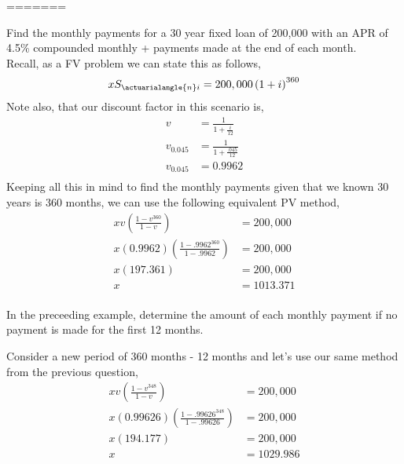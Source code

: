 \documentclass[12pt]{article}
\newenvironment{question}[2][Question]{\begin{trivlist}
\item[\hskip \labelsep {\bfseries #1}\hskip \labelsep {\bfseries #2.}]}{\end{trivlist}}
\begin{document}
=======
\begin{question}[Question 2.2.7]
	a Find the monthly payments for a 30 year fixed loan of 200,000
	with an APR of 4.5\% compounded monthly + payments made at the end
	of each month.\\

	Recall, as a FV problem we can state this as follows,\\
	\begin{align*}
		xS_{\actuarialangle{n}i} &= 200,000 \left(1+i \right)^{360}\\
	\end{align*}
	Note also, that our discount factor in this scenario is,\\
	\begin{align*}
		v &= \frac{1}{1+\frac{i}{12}}\\
		v_{0.045} &= \frac{1}{1+\frac{.045}{12}}\\
		v_{0.045} &= 0.9962\\
	\end{align*}
	Keeping all this in mind to find the monthly payments  given that we known 30 years
	is 360 months, we can use the following equivalent PV method,\\
	\begin{align*}
		xv \left(\frac{1-v^{360}}{1-v}\right) &= 200,000\\
		x \left(0.9962 \right)(\frac{1-.9962^{360}}{1-.9962})&= 200,000\\
		x \left(197.361\right) &= 200,000\\
		x &= 1013.371\\
	\end{align*}

\hline
\pagebreak

\begin{question}[Question 2.2.11]
	a In the preceeding example, determine the amount of each monthly payment
	if no payment is made for the first 12 months.\\
\end{question}

Consider a new period of 360 months - 12 months and let's use our same method from the previous question,\\
	\begin{align*}
	{xv \left(\frac{1-v^{348}}{1-v}\right)} &= 200,000\\
	x \left(0.99626 \right)(\frac{1-.99626^{348}}{1-.99626})&= 200,000\\
	x \left(194.177\right) &= 200,000\\
	x &= 1029.986\\
	\end{align*}
    

\end{question}
\end{document}
